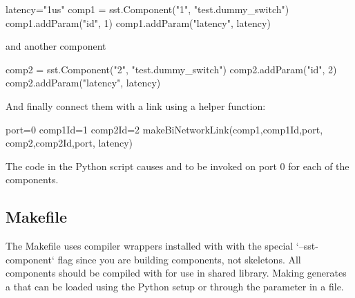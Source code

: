 \begin{CppCode}
latency="1us"
comp1 = sst.Component("1", "test.dummy_switch")
comp1.addParam("id", 1)
comp1.addParam("latency", latency)
\end{CppCode}
and another component

\begin{CppCode}
comp2 = sst.Component("2", "test.dummy_switch")
comp2.addParam("id", 2)
comp2.addParam("latency", latency)
\end{CppCode}
And finally connect them with a link using a \sstmacro helper function:

\begin{CppCode}
port=0
comp1Id=1
comp2Id=2
makeBiNetworkLink(comp1,comp1Id,port,
                  comp2,comp2Id,port,
                  latency)
\end{CppCode}
The code in the Python script causes  and  to be invoked on port 0 for each of the components.

\subsection{Makefile}
\label{subsec:makefile}

The Makefile uses compiler wrappers installed with \sstmacro with the special `--sst-component` flag since you are building components, not skeletons.
All components should be compiled with  for use in shared library.
Making generates a  that can be loaded using the Python setup or through the  parameter in a  file.


